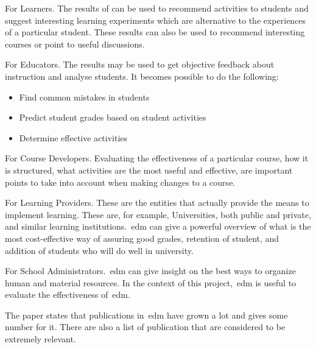 For Learners. The results of can be used to recommend activities to students
and suggest interesting learning experiments which are alternative to the
experiences of a particular student. These results can also be used to
recommend interesting courses or point to useful discussions.

For Educators. The results may be used to get objective feedback about
instruction and analyse students. It becomes possible to do the following:

\begin{itemize}
    \item Find common mistakes in students
    \item Predict student grades based on student activities
    \item Determine effective activities
\end{itemize}

For Course Developers. Evaluating the effectiveness of a particular course, how
it is structured, what activities are the most useful and effective, are
important points to take into account when making changes to a course.

For Learning Providers. These are the entities that actually provide the means
to implement learning. These are, for example, Universities, both public and
private, and similar learning institutions.~\gls{edm} can give a powerful
overview of what is the most cost-effective way of assuring good grades,
retention of student, and addition of students who will do well in university.

For School Administrators.~\gls{edm} can give insight on the best ways to
organize human and material resources. In the context of this
project,~\gls{edm} is useful to evaluate the effectiveness of~\gls{edm}.

The paper states that publications in~\gls{edm} have grown a lot and gives some
number for it. There are also a list of publication that are considered to be
extremely relevant.
